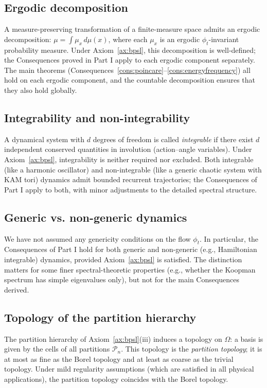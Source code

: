 \documentclass[11pt,twocolumn,a4paper]{article}
\theoremstyle{axiomstyle}
\theoremstyle{conseqstyle}
\theoremstyle{definition}
\theoremstyle{remark}
\newcommand{\Partition}{\mathcal{P}}
\begin{document}
\subsection{Ergodic decomposition}

A measure-preserving transformation of a finite-measure space admits an ergodic decomposition: $\mu=\int\mu_{x}\,d\mu(x)$, where each $\mu_{x}$ is an ergodic $\phi_{t}$-invariant probability measure. Under Axiom~\ref{ax:bpsl}, this decomposition is well-defined; the Consequences proved in Part I apply to each ergodic component separately. The main theorems (Consequences~\ref{cons:poincare}--\ref{cons:energyfrequency}) all hold on each ergodic component, and the countable decomposition ensures that they also hold globally.

\subsection{Integrability and non-integrability}

A dynamical system with $d$ degrees of freedom is called \emph{integrable} if there exist $d$ independent conserved quantities in involution (action--angle variables). Under Axiom~\ref{ax:bpsl}, integrability is neither required nor excluded. Both integrable (like a harmonic oscillator) and non-integrable (like a generic chaotic system with KAM tori) dynamics admit bounded recurrent trajectories; the Consequences of Part I apply to both, with minor adjustments to the detailed spectral structure.

\subsection{Generic vs. non-generic dynamics}

We have not assumed any genericity conditions on the flow $\phi_{t}$. In particular, the Consequences of Part I hold for both generic and non-generic (e.g., Hamiltonian integrable) dynamics, provided Axiom~\ref{ax:bpsl} is satisfied. The distinction matters for some finer spectral-theoretic properties (e.g., whether the Koopman spectrum has simple eigenvalues only), but not for the main Consequences derived.

\subsection{Topology of the partition hierarchy}

The partition hierarchy of Axiom~\ref{ax:bpsl}(iii) induces a topology on $\Omega$: a basis is given by the cells of all partitions $\Partition_{n}$. This topology is the \emph{partition topology}; it is at most as fine as the Borel topology and at least as coarse as the trivial topology. Under mild regularity assumptions (which are satisfied in all physical applications), the partition topology coincides with the Borel topology.
\end{document}
